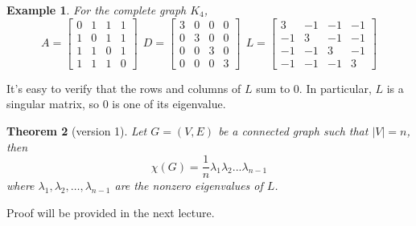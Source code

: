 \documentclass[11pt]{article}
\newtheorem{theorem}{Theorem}
\newtheorem{example}[theorem]{Example}
\newcommand{\ignore}[1]{} %
\begin{document}
\begin{example}
For the complete graph $K_4$,
$$A=
\begin{bmatrix}
0&1&1&1\\
1&0&1&1\\
1&1&0&1\\
1&1&1&0
\end{bmatrix}
~~D=
\begin{bmatrix}
3&0&0&0\\
0&3&0&0\\
0&0&3&0\\
0&0&0&3
\end{bmatrix}
~~L=
\begin{bmatrix}
3&-1&-1&-1\\
-1&3&-1&-1\\
-1&-1&3&-1\\
-1&-1&-1&3
\end{bmatrix}
$$
\end{example}

It's easy to verify that the rows and columns of $L$ sum to 0. In particular, $L$ is a singular matrix, so 0 is one of its eigenvalue.

\begin{theorem}[version 1]
Let $G=(V,E)$ be a connected graph such that $|V|=n$, then
$$\chi(G)=\frac{1}{n}\lambda_1\lambda_2...\lambda_{n-1}$$
where $\lambda_1,\lambda_2,\ldots,\lambda_{n-1}$ are the nonzero eigenvalues of $L$.
\end{theorem}

Proof will be provided in the next lecture.


\ignore{This sentence won't appear in the latex output.} %

\end{document}
